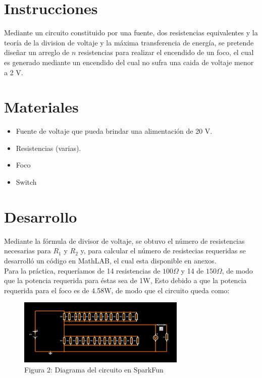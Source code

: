 \documentclass[]{article}
\begin{document}
\section{Instrucciones}

Mediante un circuito constituido por una fuente, dos resistencias equivalentes y
la teoría de la division de voltaje y la máxima transferencia de energía, se
pretende diseñar un arreglo de $n$ resistencias para realizar el encendido de
un foco, el cual es generado mediante un encendido del cual no sufra una caida
de voltaje menor a 2 V.

\section{Materiales}

\begin{itemize}
    \item Fuente de voltaje que pueda brindar una alimentación de 20 V.
    \item Resistencias (varias).
    \item Foco
    \item Switch
    \end{itemize}


\section{Desarrollo}

Mediante la fórmula de divisor de voltaje, se obtuvo el número de resistencias necesarias 
para $R_1$ y $R_2$ y, para calcular el número de resistecias requeridas se desarrolló un código en MathLAB, el cual esta disponible en anexos.\\

Para la práctica, requeríamos de 14 resistencias de $100 \Omega$  y 14 de $150 \Omega$, de modo que la potencia requerida para éstas sea de 1W, 
Esto debido a que la potencia requerida para el foco es de 4.58W, de modo que el circuito queda como:
\clearpage

\begin{figure}
    \centering
    \includegraphics[width=8cm]{build/Imagenes/Circuito1.jpg}
    \caption{Figura 2: Diagrama del circuito en SparkFun}
\end{figure}
    
\end{document}
